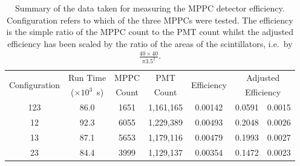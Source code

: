 \begin{table}
  \begin{center}
    \begin{tabular}{c | c | c | c | c | r@{~\( \pm \)~}l}
      \multirow{2}{*}{Configuration} 
                     &  Run Time             &  MPPC   &  PMT        &  \multirow{2}{*}{Efficiency} 
                                                                                    &  \multicolumn{2}{c}{Adjusted}   \\
                     &  (\(\times 10^3\)~s)  &  Count  &  Count      &              &  \multicolumn{2}{c}{Efficiency} \\
      \hline
      123            &  86.0                 &  1651   &  1,161,165  &  0.00142     &  0.0591 & 0.0015  \\
      12             &  92.3                 &  6055   &  1,229,389  &  0.00493     &  0.2048 & 0.0026  \\
      13             &  87.1                 &  5653   &  1,179,116  &  0.00479     &  0.1993 & 0.0027  \\
      23             &  84.4                 &  3999   &  1,129,137  &  0.00354     &  0.1472 & 0.0023  \\
        
    \end{tabular}
  \end{center}
  \caption{Summary of the data taken for measuring the MPPC detector efficiency. Configuration refers to which of the three MPPCs were tested. The efficiency is the simple ratio of the MPPC count to the PMT count whilst the adjusted efficiency has been scaled by the ratio of the areas of the scintillators, i.e.\ by \( \frac{40\times40}{\pi3.5^2} \).}
  \label{tab:music2_eff}
\end{table}

